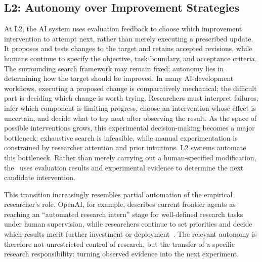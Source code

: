 \subsection{L2: Autonomy over Improvement Strategies}
\label{sec:l2-strategy}

At L2, the AI system uses evaluation feedback to choose which improvement
intervention to attempt next, rather than merely executing a prescribed
update.
It proposes and tests changes to the target and retains accepted
revisions, while humans continue to specify the objective, task boundary, and acceptance criteria.
The surrounding search framework may remain fixed; autonomy lies in determining how the target should be improved.
In many AI-development workflows, executing a proposed change is comparatively mechanical; the difficult part is deciding which change is worth trying. Researchers must interpret failures, infer which component is limiting progress, choose an intervention whose effect is uncertain, and decide what to try next after observing the result. As the space of possible interventions grows, this experimental decision-making becomes a major bottleneck: exhaustive search is infeasible, while manual experimentation is constrained by researcher attention and prior intuitions.
L2 systems automate this bottleneck. Rather than merely carrying out a human-specified modification, the \Improver \ uses evaluation results and experimental evidence to determine the next candidate intervention.

This transition increasingly resembles partial automation of the empirical researcher's role. OpenAI, for example, describes current frontier agents as reaching an ``automated research intern'' stage for well-defined research tasks under human supervision, while researchers continue to set priorities and decide which results merit further investment or deployment~\cite{openai2026researchacceleration}. The relevant autonomy is therefore not unrestricted control of research, but the transfer of a specific research responsibility: turning observed evidence into the next experiment.


